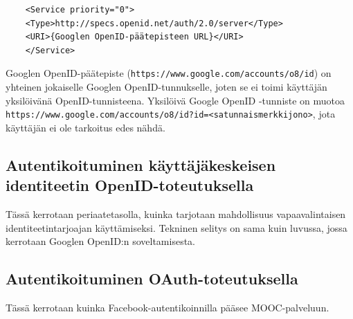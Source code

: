 \documentclass[finnish,gradu]{tktltiki}
\begin{document}
  \begin{verbatim}
    <Service priority="0">
    <Type>http://specs.openid.net/auth/2.0/server</Type>
    <URI>{Googlen OpenID-päätepisteen URL}</URI>
    </Service>
  \end{verbatim}

  Googlen OpenID-päätepiste (\verb#https://www.google.com/accounts/o8/id#) on yhteinen jokaiselle Googlen OpenID-tunnukselle, joten se ei toimi käyttäjän yksilöivänä OpenID-tunnisteena. Yksilöivä Google OpenID -tunniste on muotoa \verb#https://www.google.com/accounts/o8/id?id=<satunnaismerkkijono>#, jota käyttäjän ei ole tarkoitus edes nähdä.





  \subsection{Autentikoituminen käyttäjäkeskeisen identiteetin OpenID-toteutuksella} %
  \label{sub:autentikoituminen_käyttäjäkeskeisellä_identiteetillä}
  Tässä kerrotaan periaatetasolla, kuinka tarjotaan mahdollisuus vapaavalintaisen identiteetintarjoajan käyttämiseksi. Tekninen selitys on sama kuin luvussa, jossa kerrotaan Googlen OpenID:n soveltamisesta.


  \subsection{Autentikoituminen OAuth-toteutuksella} %
  \label{sub:autentikoituminen_oauth}
  Tässä kerrotaan kuinka Facebook-autentikoinnilla pääsee MOOC-palveluun.
\end{document}
